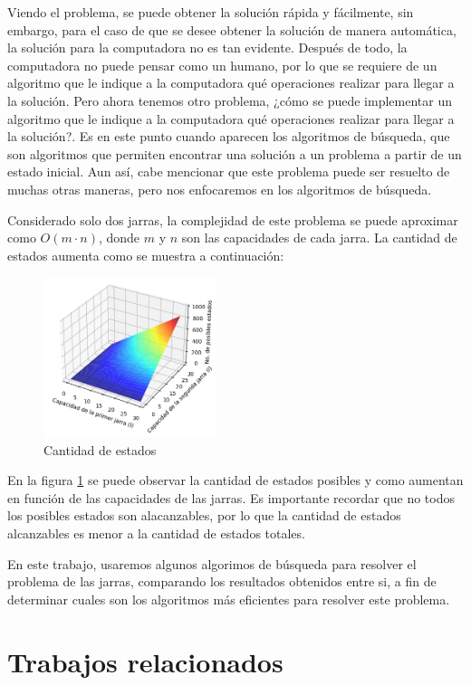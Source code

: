 \documentclass[journal]{IEEEtran}
\begin{document}
Viendo el problema, se puede obtener la solución rápida y fácilmente, sin embargo, para el caso de que se desee obtener la solución de manera automática, la solución para la computadora no es tan evidente.
Después de todo, la computadora no puede pensar como un humano, por lo que se requiere de un algoritmo que le indique a la computadora qué operaciones realizar para llegar a la solución.
Pero ahora tenemos otro problema, ¿cómo se puede implementar un algoritmo que le indique a la computadora qué operaciones realizar para llegar a la solución?. Es en este punto cuando aparecen los algoritmos de búsqueda, que son algoritmos que permiten encontrar una solución a un problema a partir de un estado inicial. Aun así, cabe mencionar que este problema puede ser resuelto de muchas otras maneras, pero nos enfocaremos en los algoritmos de búsqueda.

Considerado solo dos jarras, la complejidad de este problema se puede aproximar como $O(m \cdot n)$, donde $m$ y $n$ son las capacidades de cada jarra. La cantidad de estados aumenta como se muestra a continuación:

\begin{figure}[h]
  \centering
  \includegraphics[width=0.45\textwidth]{figures/estados.png}
  \centering
  \caption{Cantidad de estados}
  \label{fig:estados}
\end{figure}

En la figura \ref{fig:estados} se puede observar la cantidad de estados posibles y como aumentan en función de las capacidades de las jarras. Es importante recordar que no todos los posibles estados son alacanzables, por lo que la cantidad de estados alcanzables es menor a la cantidad de estados totales.

En este trabajo, usaremos algunos algorimos de búsqueda para resolver el problema de las jarras, comparando los resultados obtenidos entre si, a fin de determinar cuales son los algoritmos más eficientes para resolver este problema.
\section{Trabajos relacionados}
\end{document}
